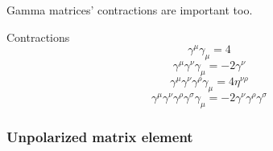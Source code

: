 Gamma matrices' contractions are important too.

\begin{proposition}[before upper = {\tcbtitle}]{Contractions}{}
  \begin{equation}
    \gamma^\mu \gamma_\mu = 4
  \end{equation}
  \begin{equation}
    \gamma^\mu \gamma^\nu \gamma_\mu = -2 \gamma^\nu
  \end{equation}
  \begin{equation}
    \gamma^\mu \gamma^\nu \gamma^\rho \gamma_\mu = 4 \eta^{\nu \rho}
  \end{equation}
  \begin{equation}
    \gamma^\mu \gamma^\nu \gamma^\rho \gamma^\sigma \gamma_\mu = -2 \gamma^\nu \gamma^\rho \gamma^\sigma
  \end{equation}
\end{proposition}

\subsubsection{Unpolarized matrix element}

